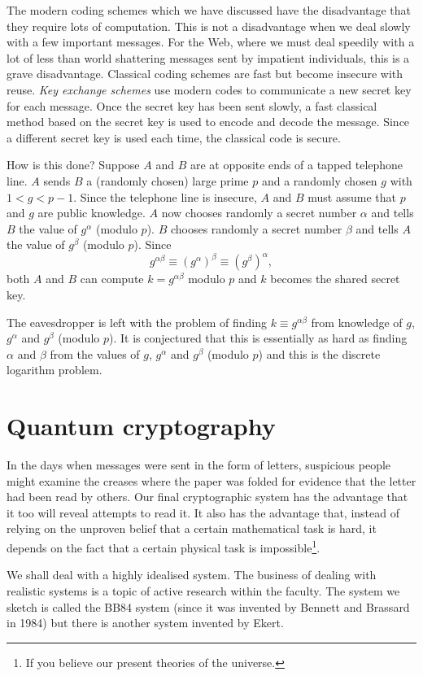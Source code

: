 The modern coding schemes which we have discussed
have the disadvantage that they require lots of computation.
This is not a disadvantage when we deal slowly
with a few important messages. For the Web, where
we must deal speedily with a lot of less than
world shattering messages sent by impatient
individuals, this is a grave disadvantage.
Classical coding schemes are fast but become
insecure with reuse. \emph{Key exchange schemes}
use modern codes to communicate a new
secret key for each message. Once the secret
key has been sent slowly, a fast classical
method based on the secret key is used to
encode and decode the message. Since a different
secret key is used each time, the classical code
is secure.

How is this done? Suppose $A$ and $B$ are at opposite
ends of a tapped telephone line. $A$ sends $B$
a (randomly chosen) large prime $p$ and a
randomly chosen $g$ with $1<g<p-1$. Since the
telephone line is insecure, $A$ and $B$ must
assume that $p$ and $g$ are public knowledge.
$A$ now chooses randomly a secret number $\alpha$ and
tells $B$ the value of $g^{\alpha}$ (modulo $p$). $B$
chooses randomly a secret number $\beta$ and
tells $A$ the value of $g^{\beta}$ (modulo $p$). Since
\[g^{\alpha\beta}\equiv(g^{\alpha})^{\beta}\equiv(g^{\beta})^{\alpha},\]
both $A$ and $B$ can compute $k=g^{\alpha\beta}$
modulo $p$ and $k$ becomes the shared secret key.

The eavesdropper is left with the problem of
finding $k\equiv g^{\alpha\beta}$ from knowledge
of $g$, $g^{\alpha}$ and $g^{\beta}$ (modulo $p$).
It is conjectured that this is essentially
as hard as finding $\alpha$ and $\beta$
from the values of $g$, $g^{\alpha}$ and $g^{\beta}$ (modulo $p$)
and this is the discrete logarithm problem.
\section{Quantum cryptography} 
In the days 
when messages were sent in the form of letters,
suspicious people might examine the creases 
where the paper was folded for evidence that
the letter had been read by others. Our final
cryptographic system has the advantage that it
too will reveal attempts to read it. It also
has the advantage that, instead of relying
on the unproven belief that a certain mathematical
task is hard, it depends on the fact that a certain
physical task is impossible\footnote{If you
believe our present theories of the universe.}.

We shall deal with a highly idealised system.
The business of dealing with realistic systems
is a topic of active research within the faculty.
The system we sketch is called the BB84 system
(since it was invented by Bennett and Brassard in 1984)
but there is another system invented by Ekert.

